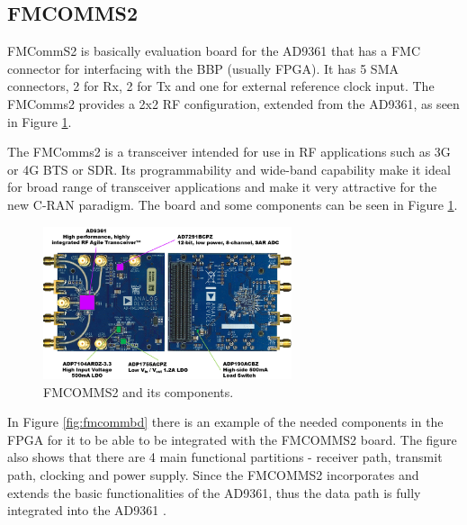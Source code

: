 \subsection{FMCOMMS2}
\label{trans:fmcomms2}

FMCommS2 is basically evaluation board for the AD9361 that has a FMC connector
for interfacing with the BBP (usually FPGA). It has 5 SMA connectors, 2 for Rx,
2 for Tx and one for external reference clock input. The FMComms2 provides a 2x2
RF configuration, extended from the AD9361, as seen in Figure \ref{fig:fmcomm}.

The FMComms2 is a transceiver intended for use in RF applications such  as 3G or
4G BTS or SDR. Its programmability and wide-band capability make it ideal for
broad range of transceiver applications and make it very attractive for the new
C-RAN paradigm. The board and some components can be seen in Figure
\ref{fig:fmcomm}.

\begin{figure}[htbp]
    \centering
    \includegraphics[width=0.65\textwidth]{./figures/fmcomms2_pic}
    \caption{ FMCOMMS2 and its components.
    \label{fig:fmcomm}}
\end{figure}


In Figure \ref{fig:fmcommbd} there is an example of the needed components in the
FPGA for it to be able to be integrated with the FMCOMMS2 board. The figure also
shows that there are 4 main functional partitions - receiver path, transmit
path, clocking and power supply. Since the FMCOMMS2 incorporates and extends the
basic functionalities of the AD9361, thus the data path is fully integrated into
the AD9361 \cite{web:fmcomms2wiki}.

